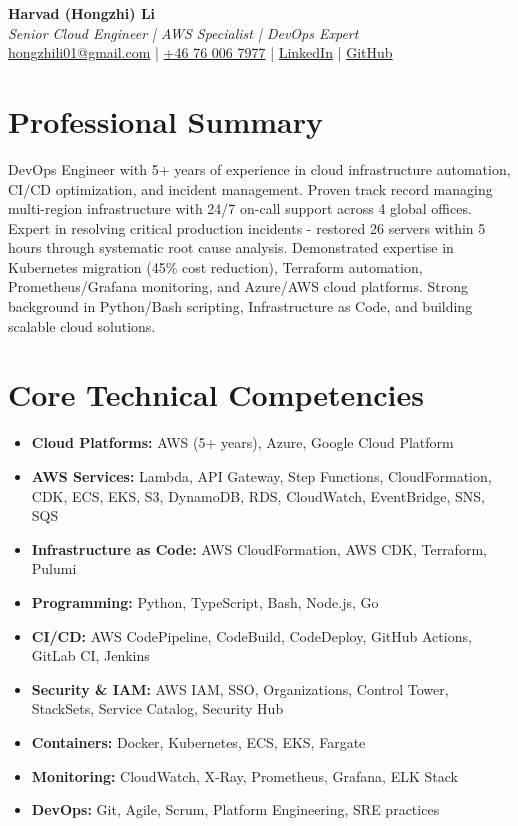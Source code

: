 \documentclass[11pt,a4paper]{article}
\begin{document}
\begin{center}
{\LARGE \textbf{Harvad (Hongzhi) Li}}\\[10pt]
{\Large \textit{Senior Cloud Engineer | AWS Specialist | DevOps Expert}}\\[10pt]
\textcolor{titlecolor}{\href{mailto:hongzhili01@gmail.com}{hongzhili01@gmail.com} | \href{tel:+46760067977}{+46 76 006 7977} | \href{https://www.linkedin.com/in/harvad/}{LinkedIn} | \href{https://github.com/bluehawana}{GitHub}}
\end{center}

\vspace{8pt}

\section*{Professional Summary}

DevOps Engineer with 5+ years of experience in cloud infrastructure automation, CI/CD optimization, and incident management. Proven track record managing multi-region infrastructure with 24/7 on-call support across 4 global offices. Expert in resolving critical production incidents - restored 26 servers within 5 hours through systematic root cause analysis. Demonstrated expertise in Kubernetes migration (45\% cost reduction), Terraform automation, Prometheus/Grafana monitoring, and Azure/AWS cloud platforms. Strong background in Python/Bash scripting, Infrastructure as Code, and building scalable cloud solutions.

\section*{Core Technical Competencies}

\begin{itemize}[leftmargin=*, itemsep=2pt]
\item \textbf{Cloud Platforms:} AWS (5+ years), Azure, Google Cloud Platform
\item \textbf{AWS Services:} Lambda, API Gateway, Step Functions, CloudFormation, CDK, ECS, EKS, S3, DynamoDB, RDS, CloudWatch, EventBridge, SNS, SQS
\item \textbf{Infrastructure as Code:} AWS CloudFormation, AWS CDK, Terraform, Pulumi
\item \textbf{Programming:} Python, TypeScript, Bash, Node.js, Go
\item \textbf{CI/CD:} AWS CodePipeline, CodeBuild, CodeDeploy, GitHub Actions, GitLab CI, Jenkins
\item \textbf{Security \& IAM:} AWS IAM, SSO, Organizations, Control Tower, StackSets, Service Catalog, Security Hub
\item \textbf{Containers:} Docker, Kubernetes, ECS, EKS, Fargate
\item \textbf{Monitoring:} CloudWatch, X-Ray, Prometheus, Grafana, ELK Stack
\item \textbf{DevOps:} Git, Agile, Scrum, Platform Engineering, SRE practices
\end{itemize}
\end{document}

